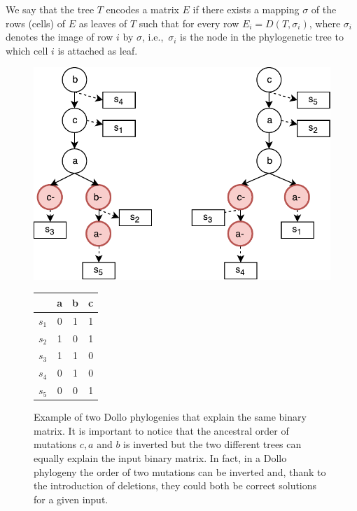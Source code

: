 \documentclass[a4paper,USenglish]{article}
\newcommand{\ie}{i.e.,~}
\theoremstyle{definition}
\begin{document}
We say that the tree $T$ encodes a matrix $E$ 
if there exists a mapping $\sigma$ of the rows (cells) of $E$
as leaves of $T$ such that for every row $E_{i}=D(T,\sigma_i)$,
where $\sigma_i$ denotes the image of row $i$ by $\sigma$, 
\ie $\sigma_i$ is the node in the phylogenetic tree to which cell $i$ is attached as leaf.
\begin{figure}[!tb]
  \begin{minipage}{0.7\linewidth}
    \includegraphics[scale=.4]{img/dollo_non_unique}
\end{minipage}
\begin{minipage}{0.2\linewidth}
    \begin{tabular}[!t]{c|ccc}
            & a & b & c \\ \hline
            $s_1$ & 0 & 1 & 1 \\
            $s_2$ & 1 & 0 & 1 \\
            $s_3$ & 1 & 1 & 0 \\
            $s_4$ & 0 & 1 & 0 \\
            $s_5$ & 0 & 0 & 1
\end{tabular}
\end{minipage}
\caption{Example of two Dollo phylogenies that explain the same binary matrix. 
It is important to notice that the ancestral order of mutations $c,a$ and $b$ is inverted but the two different trees can equally explain the input binary matrix. In fact, in a Dollo phylogeny the order of two mutations can be inverted and, thank to the introduction of deletions, they could both be correct solutions for a given input.
}
\label{fig:dollo_non_unique}
\end{figure}
\end{document}
